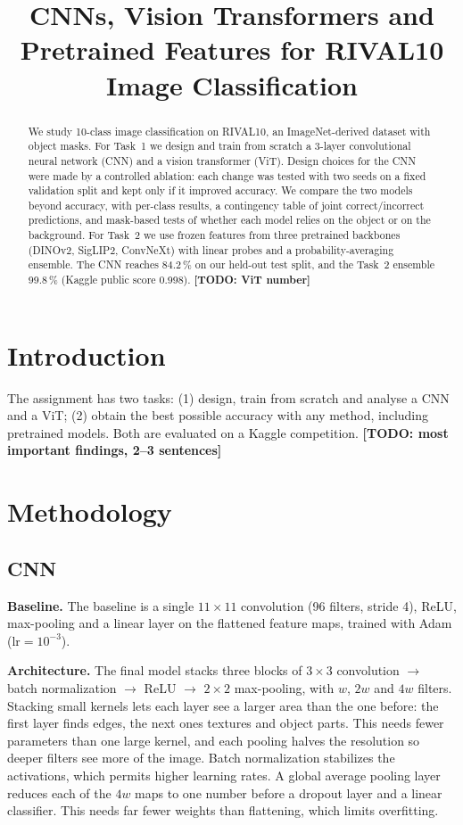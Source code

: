 \documentclass[conference]{IEEEtran}
\newcommand{\todo}[1]{\textbf{[TODO: #1]}}
\begin{document}
\title{CNNs, Vision Transformers and Pretrained Features for RIVAL10 Image Classification}
\author{\IEEEauthorblockN{\todo{Names, alphabetical}}}
\maketitle

\begin{abstract}
We study 10-class image classification on RIVAL10, an ImageNet-derived dataset with object masks. For Task~1 we design and train from scratch a 3-layer convolutional neural network (CNN) and a vision transformer (ViT). Design choices for the CNN were made by a controlled ablation: each change was tested with two seeds on a fixed validation split and kept only if it improved accuracy. We compare the two models beyond accuracy, with per-class results, a contingency table of joint correct/incorrect predictions, and mask-based tests of whether each model relies on the object or on the background. For Task~2 we use frozen features from three pretrained backbones (DINOv2, SigLIP2, ConvNeXt) with linear probes and a probability-averaging ensemble. The CNN reaches 84.2\,\% on our held-out test split, and the Task~2 ensemble 99.8\,\% (Kaggle public score 0.998). \todo{ViT number}
\end{abstract}

\section{Introduction}
The assignment has two tasks: (1) design, train from scratch and analyse a CNN and a ViT; (2) obtain the best possible accuracy with any method, including pretrained models. Both are evaluated on a Kaggle competition. \todo{most important findings, 2--3 sentences}

\section{Methodology}
\subsection{CNN}
\textbf{Baseline.} The baseline is a single $11\times11$ convolution (96 filters, stride 4), ReLU, max-pooling and a linear layer on the flattened feature maps, trained with Adam ($\text{lr}=10^{-3}$).

\textbf{Architecture.} The final model stacks three blocks of $3\times3$ convolution $\rightarrow$ batch normalization $\rightarrow$ ReLU $\rightarrow$ $2\times2$ max-pooling, with $w$, $2w$ and $4w$ filters. Stacking small kernels lets each layer see a larger area than the one before: the first layer finds edges, the next ones textures and object parts. This needs fewer parameters than one large kernel, and each pooling halves the resolution so deeper filters see more of the image. Batch normalization stabilizes the activations, which permits higher learning rates. A global average pooling layer reduces each of the $4w$ maps to one number before a dropout layer and a linear classifier. This needs far fewer weights than flattening, which limits overfitting.
\end{document}
